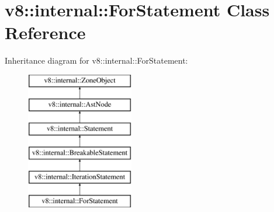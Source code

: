 \hypertarget{classv8_1_1internal_1_1_for_statement}{}\section{v8\+:\+:internal\+:\+:For\+Statement Class Reference}
\label{classv8_1_1internal_1_1_for_statement}
Inheritance diagram for v8\+:\+:internal\+:\+:For\+Statement\+:\begin{figure}[H]
\begin{center}
\leavevmode
\includegraphics[height=6.000000cm]{classv8_1_1internal_1_1_for_statement}
\end{center}
\end{figure}
